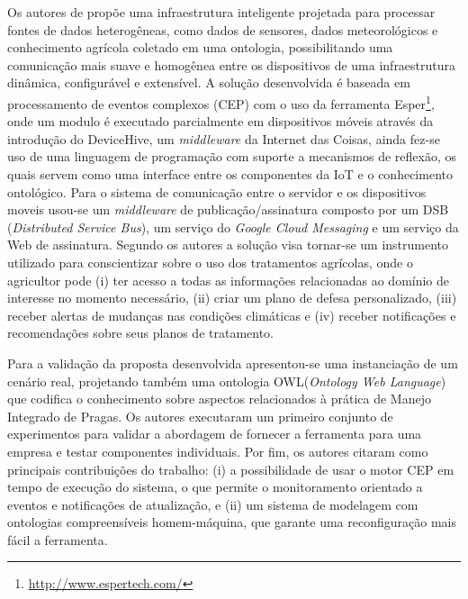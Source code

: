 \documentclass[ti,table]{texufpel} %
\begin{document}
     

    Os autores de \cite{art3nocera2017semantic} propõe uma infraestrutura inteligente projetada para processar fontes de dados heterogêneas, como dados de sensores, dados meteorológicos e conhecimento agrícola coletado em uma ontologia, possibilitando uma comunicação mais suave e homogênea entre os dispositivos de uma infraestrutura dinâmica, configurável e extensível. A solução desenvolvida é baseada em processamento de eventos complexos (CEP) com o uso da ferramenta Esper\footnote{\url{http://www.espertech.com/}}, onde um modulo é executado parcialmente em dispositivos móveis através da introdução do DeviceHive, um \textit{middleware} da Internet das Coisas, ainda fez-se uso de uma linguagem de programação com suporte a mecanismos de reflexão, os quais servem como uma interface entre os componentes da IoT e o conhecimento ontológico. Para o sistema de comunicação entre o servidor e os dispositivos moveis usou-se um \textit{middleware} de publicação/assinatura composto por um DSB (\textit{Distributed Service Bus}), um serviço do \textit{Google Cloud Messaging} e um serviço da Web de assinatura. Segundo os autores a solução visa tornar-se um instrumento utilizado para conscientizar sobre o uso dos tratamentos agrícolas, onde o agricultor pode (i) ter acesso a todas as informações relacionadas ao domínio de interesse no momento necessário, (ii) criar um plano de defesa personalizado, (iii) receber alertas de mudanças nas condições climáticas e (iv) receber notificações e recomendações sobre seus planos de tratamento. 

     

    Para a validação da proposta desenvolvida apresentou-se uma instanciação de um cenário real, projetando também uma ontologia OWL(\textit{Ontology Web Language}) que codifica o conhecimento sobre aspectos relacionados à prática de Manejo Integrado de Pragas. Os autores executaram um primeiro conjunto de experimentos para validar a abordagem de fornecer a ferramenta para uma empresa e testar componentes individuais. Por fim, os autores citaram como principais contribuições do trabalho: (i) a possibilidade de usar o motor CEP em tempo de execução do sistema, o que permite o monitoramento orientado a eventos e notificações de atualização, e (ii) um sistema de modelagem com ontologias compreensíveis homem-máquina, que garante uma reconfiguração mais fácil a ferramenta.  

     

  

  
\end{document}
